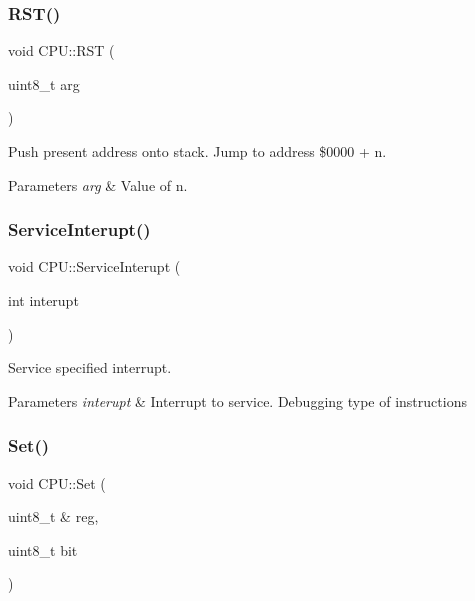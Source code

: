 \subsubsection{\texorpdfstring{R\+S\+T()}{RST()}}
{\footnotesize\ttfamily void C\+P\+U\+::\+R\+ST (\begin{DoxyParamCaption}\item[{uint8\+\_\+t}]{arg }\end{DoxyParamCaption})\hspace{0.3cm}{\ttfamily [private]}}



Push present address onto stack. Jump to address \$0000 + n. 


\begin{DoxyParams}{Parameters}
{\em arg} & Value of n. \\
\hline
\end{DoxyParams}
\mbox{\label{classCPU_ab932fc0e9d81733f90e878d644991e2e}} 
\subsubsection{\texorpdfstring{Service\+Interupt()}{ServiceInterupt()}}
{\footnotesize\ttfamily void C\+P\+U\+::\+Service\+Interupt (\begin{DoxyParamCaption}\item[{int}]{interupt }\end{DoxyParamCaption})}



Service specified interrupt. 


\begin{DoxyParams}{Parameters}
{\em interupt} & Interrupt to service. Debugging type of instructions \\
\hline
\end{DoxyParams}
\mbox{\label{classCPU_a65d2624fadb2b0d6e7921a45055139d9}} 
\subsubsection{\texorpdfstring{Set()}{Set()}}
{\footnotesize\ttfamily void C\+P\+U\+::\+Set (\begin{DoxyParamCaption}\item[{uint8\+\_\+t \&}]{reg,  }\item[{uint8\+\_\+t}]{bit }\end{DoxyParamCaption})\hspace{0.3cm}{\ttfamily [private]}}



